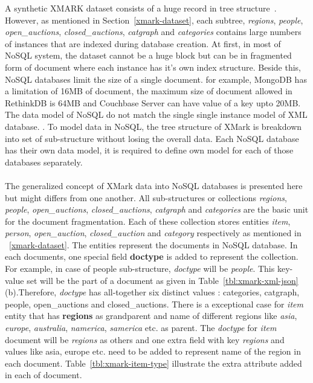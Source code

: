 A synthetic XMARK dataset consists of a huge record in tree structure~\citep{xmark/VIST}. However, as mentioned in Section~\ref{xmark-dataset}, each subtree, \textit{regions}, \textit{people}, \textit{open\_auctions}, \textit{closed\_auctions}, \textit{catgraph} and \textit{categories} contains large numbers of instances that are indexed during database creation. At first, in most of NoSQL system, the dataset cannot be a huge block but can be in fragmented form of document where each instance has it's own index structure. Beside this, NoSQL databases limit the size of a single document. for example, MongoDB has a limitation of 16MB of document, the maximum size of document allowed in RethinkDB is 64MB and Couchbase Server can have value of a key upto 20MB.
The data model of NoSQL do not match the single single instance model of XML database. . To model data in NoSQL, the tree structure of XMark is breakdown into set of sub-structure without losing the overall data.   Each NoSQL database has their own data model, it is required to define own model for each of those databases separately.
\\
\\
The generalized concept of XMark data into NoSQL databases is presented here  but might differs from one another. All sub-structures or collections \textit{regions}, \textit{people}, \textit{open\_auctions}, \textit{closed\_auctions}, \textit{catgraph} and \textit{categories} are the basic unit for the document fragmentation. Each of these collection stores entities \textit{item}, \textit{person}, \textit{open\_auction}, \textit{closed\_auction} and \textit{category} respectively as mentioned in ~\ref{xmark-dataset}. The entities represent the documents in NoSQL database. In each documents, one special field \textbf{doctype} is added to represent the collection. For example, in case of people sub-structure, \textit{doctype} will be \textit{people}. This key-value set will be the part of a document as  given in Table~\ref{tbl:xmark-xml-json}(b).Therefore, \textit{doctype} has all-together six distinct values : categories, catgraph, people, open\_auctions and closed\_auctions. There is a exceptional case for \textit{item} entity  that has \textbf{regions} as grandparent and name of different regions like \textit{asia}, \textit{europe}, \textit{australia}, \textit{namerica}, \textit{samerica} etc. as parent.  The \textit{doctype} for \textit{item} document will be \textit{regions} as others and one extra field with key \textit{regions} and values like asia, europe etc. need to be added to represent name of the region in each document. Table~\ref{tbl:xmark-item-type} illustrate the extra attribute added in each of document.

